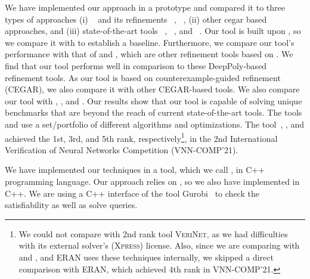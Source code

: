 We have implemented our approach in a prototype and compared it to three types of approaches 
(i) \deeppoly{}~\cite{singh2019abstract} and its refinements \kpoly{}~\cite{singh2019beyond}, \deepsrgr{}~\cite{yang2021improving}, 
(ii) other cegar based approaches, and 
(iii) state-of-the-art tools \alphabeta~\cite{zhang2018efficient,wang2021beta,xu2020fast,zhang2022branch,tjeng2017evaluating}, 
\ovaltool~\cite{bunel2018unified,bunel2020branch,bunel2020lagrangian,de2021scaling,de2021scaling,de2021scaling2,de2021improved}, 
and \marabou~\cite{katz2019marabou}. 
{\color{red}
Our tool is built upon \deeppoly{}, so we compare it with \deeppoly{} to establish a baseline. 
Furthermore, we compare our tool's performance with that of \kpoly{} and \deepsrgr{}, 
which are other refinement tools based on \deeppoly{}. 
We find that our tool performs well in comparison to these DeepPoly-based refinement tools.
As our tool is based on counterexample-guided refinement (CEGAR), we also compare it with other CEGAR-based tools. 
We also compare our tool with \alphabeta{}, \ovaltool{}, and \marabou{}. 
Our results show that our tool is capable of solving unique benchmarks 
that are beyond the reach of current state-of-the-art tools.
}
The tools \alphabeta{} and \ovaltool{} use a set/portfolio of different algorithms and optimizations. 
The tool~\alphabeta{}, \ovaltool{}, and \marabou{} achieved the 1st, 3rd, and 5th rank, 
respectively\footnote{We could not compare with 2nd rank tool \textsc{VeriNet}, as we had difficulties with its external solver's (\textsc{Xpress}) license. Also, since we are comparing with \deeppoly{} and \kpoly{}, and \textsc{ERAN} uses these techniques internally, we skipped a direct comparison with \textsc{ERAN}, which achieved 4th rank in VNN-COMP'21.}, 
in the 2nd International Verification of Neural Networks Competition (VNN-COMP'21).
\medskip

We have implemented our techniques in a tool, which we call \drefine{}, in \textsc{C++} programming language. Our approach relies on \deeppoly{}, so we also have implemented \deeppoly{} in \textsc{C++}. We are using a \textsc{C++} interface of the tool Gurobi~\cite{gurobioptimizer} to check the satisfiability as well as solve  \maxsat{} queries. %

